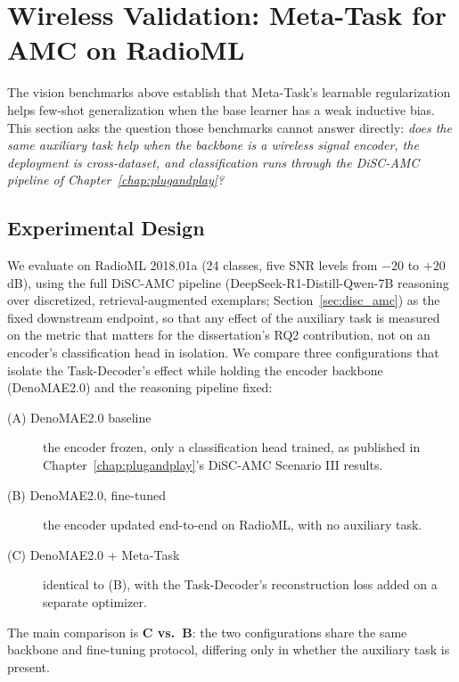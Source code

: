 \section{Wireless Validation: Meta-Task for AMC on RadioML}
\label{sec:wireless_meta_task}

The vision benchmarks above establish that Meta-Task's learnable regularization helps few-shot generalization when the base learner has a weak inductive bias. This section asks the question those benchmarks cannot answer directly: \textit{does the same auxiliary task help when the backbone is a wireless signal encoder, the deployment is cross-dataset, and classification runs through the DiSC-AMC pipeline of Chapter~\ref{chap:plugandplay}?}

\subsection{Experimental Design}

We evaluate on RadioML 2018.01a (24 classes, five SNR levels from $-20$ to $+20$ dB), using the full DiSC-AMC pipeline (DeepSeek-R1-Distill-Qwen-7B reasoning over discretized, retrieval-augmented exemplars; Section~\ref{sec:disc_amc}) as the fixed downstream endpoint, so that any effect of the auxiliary task is measured on the metric that matters for the dissertation's RQ2 contribution, not on an encoder's classification head in isolation. We compare three configurations that isolate the Task-Decoder's effect while holding the encoder backbone (DenoMAE2.0) and the reasoning pipeline fixed:
\begin{description}
    \item[(A) DenoMAE2.0 baseline] the encoder frozen, only a classification head trained, as published in Chapter~\ref{chap:plugandplay}'s DiSC-AMC Scenario III results.
    \item[(B) DenoMAE2.0, fine-tuned] the encoder updated end-to-end on RadioML, with no auxiliary task.
    \item[(C) DenoMAE2.0 + Meta-Task] identical to (B), with the Task-Decoder's reconstruction loss added on a separate optimizer.
\end{description}
The main comparison is \textbf{C vs.\ B}: the two configurations share the same backbone and fine-tuning protocol, differing only in whether the auxiliary task is present.

